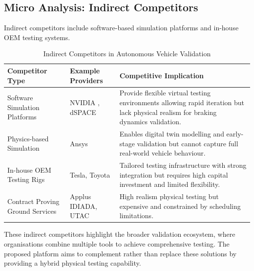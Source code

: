 
\subsection{Micro Analysis: Indirect Competitors}

Indirect competitors include software-based simulation platforms and in-house OEM testing systems. 

\begin{table}[h]
\centering
\caption{Indirect Competitors in Autonomous Vehicle Validation}
\label{tab:indirect_competitors}
\footnotesize
\singlespacing
\begin{tabularx}{\textwidth}{|p{2.8cm}|p{3.2cm}|X|}
\hline
\textbf{Competitor Type} & \textbf{Example Providers} & \textbf{Competitive Implication} \\
\hline
Software Simulation Platforms & NVIDIA \cite{nvidia_drive_sim}, dSPACE & Provide flexible virtual testing environments allowing rapid iteration but lack physical realism for braking dynamics validation. \\
\hline
Physics-based Simulation & Ansys \cite{ansys_autonomy} & Enables digital twin modelling and early-stage validation but cannot capture full real-world vehicle behaviour. \\
\hline
In-house OEM Testing Rigs & Tesla, Toyota & Tailored testing infrastructure with strong integration but requires high capital investment and limited flexibility. \\
\hline
Contract Proving Ground Services & Applus IDIADA, UTAC \cite{utac_millbrook} & High realism physical testing but expensive and constrained by scheduling limitations. \\
\hline
\end{tabularx}
\end{table}

These indirect competitors highlight the broader validation ecosystem, where organisations combine multiple tools to achieve comprehensive testing. The proposed platform aims to complement rather than replace these solutions by providing a hybrid physical testing capability.


